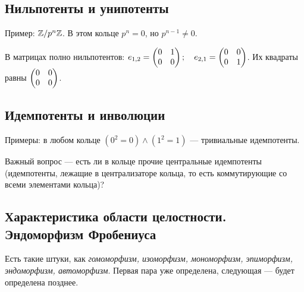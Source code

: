 \documentclass[a4paper]{report}
\begin{document}
    \subsection{Нильпотенты и унипотенты}
    Пример:
    $\mathbb{Z} / p^n\mathbb{Z}$.
    В этом кольце $p^n = 0$, но $p^{n - 1} \ne 0$.

    В матрицах полно нильпотентов: $e_{1,2} = \begin{pmatrix}0&1\\0&0\end{pmatrix}; \quad e_{2, 1} = \begin{pmatrix}0&0\\0&1\end{pmatrix}$.
    Их квадраты равны $\begin{pmatrix}0&0\\0&0\end{pmatrix}$.



    \subsection{Идемпотенты и инволюции}
    Примеры: в любом кольце $(0^2 = 0) \land (1^2 = 1)$ --- тривиальные идемпотенты.

    Важный вопрос --- есть ли в кольце прочие центральные идемпотенты (идемпотенты, лежащие в централизаторе кольца, то есть коммутирующие со всеми элементами кольца)?


    \subsection{Характеристика области целостности. Эндоморфизм Фробениуса}
    Есть такие штуки, как \textit{гомоморфизм, изоморфизм, мономорфизм, эпиморфизм, эндоморфизм, автоморфизм}.
    Первая пара уже определена, следующая --- будет определена позднее.
\end{document}
